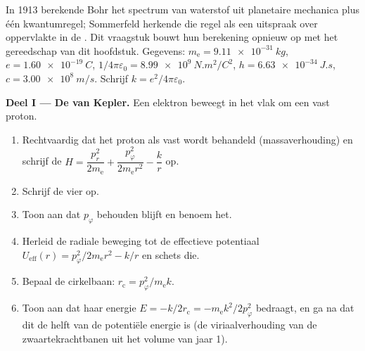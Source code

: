 \begin{problem}\label{pb:b3:hamiltonian-mechanics:1}
In 1913 berekende Bohr het spectrum van waterstof uit planetaire
mechanica plus één kwantumregel; Sommerfeld herkende die regel als een
uitspraak over oppervlakte in de . Dit vraagstuk bouwt hun
berekening opnieuw op met het gereedschap van dit hoofdstuk. Gegevens:
$m_{\text{e}} =
\qty{9.11e-31}{kg}$, $e = \qty{1.60e-19}{C}$,
$1/4\pi\varepsilon_0 =
\qty{8.99e9}{N.m^2/C^2}$, $h = \qty{6.63e-34}{J.s}$, $c =
\qty{3.00e8}{m/s}$. Schrijf $k = e^2/4\pi\varepsilon_0$.

\medskip\noindent\textbf{Deel I --- De  van Kepler.}
Een elektron beweegt in het vlak om een vast proton.
\begin{enumerate}
  \item Rechtvaardig dat het proton als vast wordt behandeld
        (massaverhouding) en schrijf de  $H = \dfrac{p_r^2}{2m_{\text{e}}} +
        \dfrac{p_\varphi^2}{2m_{\text{e}}r^2} - \dfrac{k}{r}$ op.
  \item Schrijf de vier  op.
  \item Toon aan dat $p_\varphi$ behouden blijft en benoem het.
  \item Herleid de radiale beweging tot de effectieve potentiaal
        $U_{\text{eff}}(r) = p_\varphi^2/2m_{\text{e}}r^2 - k/r$ en
        schets die.
  \item Bepaal de cirkelbaan: $r_{\text{c}} =
        p_\varphi^2/m_{\text{e}}k$.
  \item Toon aan dat haar energie $E = -k/2r_{\text{c}} =
        -m_{\text{e}}k^2/2p_\varphi^2$ bedraagt, en ga na dat dit de
        helft van de potentiële energie is (de viriaalverhouding van de
        zwaartekrachtbanen uit het volume van jaar 1).
\end{enumerate}


\end{problem}
